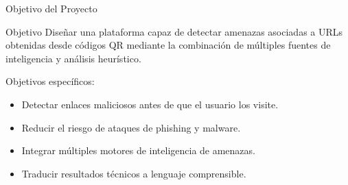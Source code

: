 \documentclass{beamer}
\begin{document}
\begin{frame}{Objetivo del Proyecto}

\begin{block}{Objetivo}
Diseñar una plataforma capaz de detectar amenazas asociadas a URLs obtenidas desde códigos QR mediante la combinación de múltiples fuentes de inteligencia y análisis heurístico.
\end{block}

\vspace{0.5cm}

Objetivos específicos:

\begin{itemize}
\item Detectar enlaces maliciosos antes de que el usuario los visite.
\item Reducir el riesgo de ataques de phishing y malware.
\item Integrar múltiples motores de inteligencia de amenazas.
\item Traducir resultados técnicos a lenguaje comprensible.
\end{itemize}

\end{frame}

\end{document}
